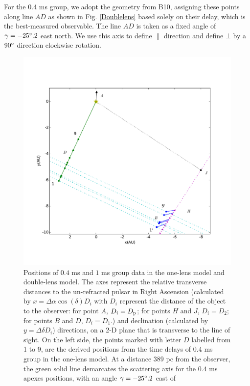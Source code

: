 \documentclass[useAMS,usenatbib]{mn2e}
\begin{document}
For the 0.4 ms group, we adopt the geometry from
B10, assigning these points along line $AD$ as
shown in Fig. \ref{Doublelens} based solely on their delay, which is
the best-measured observable.  The line $AD$ is taken as a
fixed angle of $\gamma=-25\degree.2$ east north.  We use this axis
to define ${\parallel}$ direction and define ${\bot}$ by a $90\degree$ direction clockwise
rotation.  


\begin{figure}
\centering
\includegraphics[width=7.5in]{Double_lens_xy.pdf}
\caption{Positions of $0.4$ ms and $1$ ms group data in the one-lens model and double-lens model.  
The axes represent the relative transverse distances to the un-refracted pulsar in Right Ascension (calculated by $x= \Delta \alpha \cos(\delta)D_i$ with $D_i$ represent the distance of the object to the observer: for point $A$, $D_i=D_{\rm p}$; for points $H$ and $J$, $D_i=D_2$; for points $B$ and $D$, $D_i=D_1$.) and declination (calculated by $y=\Delta \delta D_i$) directions, on a 2-D plane that is transverse to the line of sight. 
On the left side, the points marked with letter $D$ labelled from 1 to 9, are the derived
positions from the time delays of $0.4$ ms group in 
the one-lens
model.  At a distance $389$ pc from the observer, the green solid line
demarcates the scattering axis for the
$0.4$ ms apexes positions, with an angle $\gamma=-25\degree.2$ east of
}
\end{figure}
\end{document}
